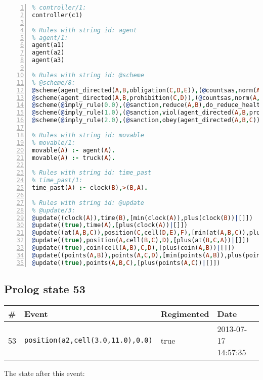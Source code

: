 \documentclass[11pt]{article}\usepackage[utf8]{inputenc}\usepackage{geometry}
\begin{document}
\begin{lstlisting}[language=Prolog, numbers=left]
% Rules with string id: controller
% controller/1:
controller(c1)

% Rules with string id: agent
% agent/1:
agent(a1)
agent(a2)
agent(a3)

% Rules with string id: @scheme
% @scheme/8:
@scheme(agent_directed(A,B,obligation(C,D,E)),(@countsas,norm(A,B,F,obligation(C,D,E)),F),false,(listTrue(C)),(time_past(D)),false,[plus(viol(agent_directed(A,B,obligation(C,D,E))))|[]],[plus(obey(agent_directed(A,B,obligation(C,D,E))))|[]])
@scheme(agent_directed(A,B,prohibition(C,D)),(@countsas,norm(A,B,E,prohibition(C,D)),E),(listTrue(C)),false,(false),false,[plus(viol(agent_directed(A,B,prohibition(C,D))))|[]],[plus(obey(agent_directed(A,B,prohibition(C,D))))|[]])
@scheme(@imply_rule(0.0),(@sanction,reduce(A,B),do_reduce_health(A,B),notifyAgent(A,changed(status))),true,false,false,false,[min(reduce(A,B))|[]],[])
@scheme(@imply_rule(1.0),(@sanction,viol(agent_directed(A,B,prohibition(C,D))),do_sanction(D)),true,false,false,false,[min(viol(agent_directed(A,B,prohibition(C,D))))|[]],[])
@scheme(@imply_rule(2.0),(@sanction,obey(agent_directed(A,B,C))),true,false,false,false,[min(obey(agent_directed(A,B,C)))|[]],[])

% Rules with string id: movable
% movable/1:
movable(A) :- agent(A).
movable(A) :- truck(A).

% Rules with string id: time_past
% time_past/1:
time_past(A) :- clock(B),>(B,A).

% Rules with string id: @update
% @update/3:
@update((clock(A)),time(B),[min(clock(A)),plus(clock(B))|[]])
@update((true),time(A),[plus(clock(A))|[]])
@update((at(A,B,C)),position(C,cell(D,E),F),[min(at(A,B,C)),plus(at(D,E,C))|[]])
@update((true),position(A,cell(B,C),D),[plus(at(B,C,A))|[]])
@update((true),coin(cell(A,B),C,D),[plus(coin(A,B))|[]])
@update((points(A,B)),points(A,C,D),[min(points(A,B)),plus(points(A,D))|[]])
@update((true),points(A,B,C),[plus(points(A,C))|[]])

\end{lstlisting}
\clearpage 
\subsection{Prolog state 53}
\begin{table}[ht]
\centering 
\begin{tabular}{l l l l} 
\textbf{\#} & \textbf{Event} & \textbf{Regimented} & \textbf{Date} \\ [0.5ex] 
\hline
53&\texttt{position(a2,cell(3.0,11.0),0.0)}&true&2013-07-17 14:57:35\\ [1ex] \hline\end{tabular}
\end{table}
The state after this event:
\end{document}
